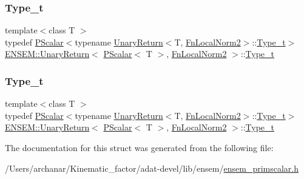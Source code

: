 \subsubsection{\texorpdfstring{Type\_t}{Type\_t}\hspace{0.1cm}{\footnotesize\ttfamily [2/3]}}
{\footnotesize\ttfamily template$<$class T $>$ \\
typedef \mbox{\hyperlink{classENSEM_1_1PScalar}{P\+Scalar}}$<$typename \mbox{\hyperlink{structENSEM_1_1UnaryReturn}{Unary\+Return}}$<$T, \mbox{\hyperlink{structENSEM_1_1FnLocalNorm2}{Fn\+Local\+Norm2}}$>$\+::\mbox{\hyperlink{structENSEM_1_1UnaryReturn_3_01PScalar_3_01T_01_4_00_01FnLocalNorm2_01_4_a852277c387f03da96f75945baafceac6}{Type\+\_\+t}}$>$ \mbox{\hyperlink{structENSEM_1_1UnaryReturn}{E\+N\+S\+E\+M\+::\+Unary\+Return}}$<$ \mbox{\hyperlink{classENSEM_1_1PScalar}{P\+Scalar}}$<$ T $>$, \mbox{\hyperlink{structENSEM_1_1FnLocalNorm2}{Fn\+Local\+Norm2}} $>$\+::\mbox{\hyperlink{structENSEM_1_1UnaryReturn_3_01PScalar_3_01T_01_4_00_01FnLocalNorm2_01_4_a852277c387f03da96f75945baafceac6}{Type\+\_\+t}}}

\mbox{\label{structENSEM_1_1UnaryReturn_3_01PScalar_3_01T_01_4_00_01FnLocalNorm2_01_4_a852277c387f03da96f75945baafceac6}} 
\subsubsection{\texorpdfstring{Type\_t}{Type\_t}\hspace{0.1cm}{\footnotesize\ttfamily [3/3]}}
{\footnotesize\ttfamily template$<$class T $>$ \\
typedef \mbox{\hyperlink{classENSEM_1_1PScalar}{P\+Scalar}}$<$typename \mbox{\hyperlink{structENSEM_1_1UnaryReturn}{Unary\+Return}}$<$T, \mbox{\hyperlink{structENSEM_1_1FnLocalNorm2}{Fn\+Local\+Norm2}}$>$\+::\mbox{\hyperlink{structENSEM_1_1UnaryReturn_3_01PScalar_3_01T_01_4_00_01FnLocalNorm2_01_4_a852277c387f03da96f75945baafceac6}{Type\+\_\+t}}$>$ \mbox{\hyperlink{structENSEM_1_1UnaryReturn}{E\+N\+S\+E\+M\+::\+Unary\+Return}}$<$ \mbox{\hyperlink{classENSEM_1_1PScalar}{P\+Scalar}}$<$ T $>$, \mbox{\hyperlink{structENSEM_1_1FnLocalNorm2}{Fn\+Local\+Norm2}} $>$\+::\mbox{\hyperlink{structENSEM_1_1UnaryReturn_3_01PScalar_3_01T_01_4_00_01FnLocalNorm2_01_4_a852277c387f03da96f75945baafceac6}{Type\+\_\+t}}}



The documentation for this struct was generated from the following file\+:\begin{DoxyCompactItemize}
\item 
/\+Users/archanar/\+Kinematic\+\_\+factor/adat-\/devel/lib/ensem/\mbox{\hyperlink{adat-devel_2lib_2ensem_2ensem__primscalar_8h}{ensem\+\_\+primscalar.\+h}}\end{DoxyCompactItemize}
